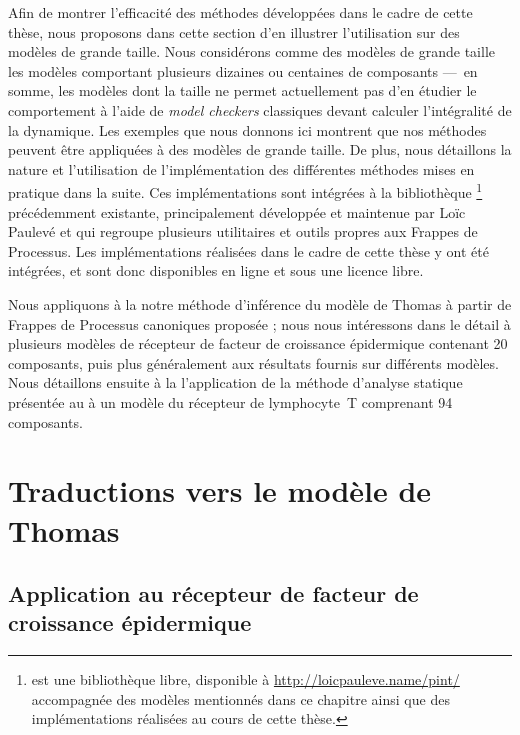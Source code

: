 Afin de montrer l'efficacité des méthodes développées dans le cadre de cette thèse,
nous proposons dans cette section d'en illustrer l'utilisation sur des modèles
de grande taille.
Nous considérons comme des modèles de grande taille les modèles comportant plusieurs
dizaines ou centaines de composants
---~en somme, les modèles dont la taille ne permet actuellement pas d'en étudier
le comportement à l'aide de \textit{model checkers} classiques
devant calculer l'intégralité de la dynamique.
Les exemples que nous donnons ici montrent que nos méthodes peuvent être
appliquées à des modèles de grande taille.
De plus, nous détaillons la nature et l'utilisation de l'implémentation
des différentes méthodes mises en pratique dans la suite.
Ces implémentations sont intégrées à la bibliothèque \Pint%
\footnote{\Pint{} est une bibliothèque libre, disponible à \url{http://loicpauleve.name/pint/}
accompagnée des modèles mentionnés dans ce chapitre
ainsi que des implémentations réalisées au cours de cette thèse.}
précédemment existante,
principalement développée et maintenue par Loïc Paulevé
et qui regroupe plusieurs utilitaires et outils propres aux Frappes de Processus.
Les implémentations réalisées dans le cadre de cette thèse y ont été intégrées,
et sont donc disponibles en ligne et sous une licence libre.

\myskip

Nous appliquons à la  notre méthode d'inférence
du modèle de Thomas à partir de Frappes de Processus canoniques proposée  ;
nous nous intéressons dans le détail à plusieurs modèles
de récepteur de facteur de croissance épidermique contenant 20 composants,
puis plus généralement aux résultats fournis sur différents modèles.
Nous détaillons ensuite à la  l'application de la méthode
d'analyse statique présentée
au  à un modèle du récepteur de lymphocyte~T comprenant 94 composants.



\section{Traductions vers le modèle de Thomas}


\subsection{Application au récepteur de facteur de croissance épidermique}

